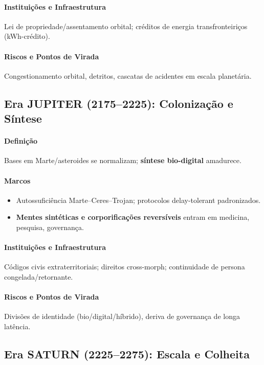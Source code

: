 \documentclass[11pt]{article}
\begin{document}
\begin{itemize}[noitemsep]
\begin{itemize}[noitemsep]
\begin{itemize}[noitemsep]
\paragraph{Instituições e Infraestrutura} Lei de propriedade/assentamento orbital; créditos de energia transfronteiriços (kWh-crédito).

\paragraph{Riscos e Pontos de Virada} Congestionamento orbital, detritos, cascatas de acidentes em escala planetária.

\subsection{Era JUPITER (2175–2225): Colonização e Síntese}
\paragraph{Definição} Bases em Marte/asteroides se normalizam; \textbf{síntese bio-digital} amadurece.

\paragraph{Marcos}
\begin{itemize}[noitemsep]
  \item Autossuficiência Marte–Ceres–Trojan; protocolos delay-tolerant padronizados.
  \item \textbf{Mentes sintéticas e corporificações reversíveis} entram em medicina, pesquisa, governança.
\end{itemize}

\paragraph{Instituições e Infraestrutura} Códigos civis extraterritoriais; direitos cross-morph; continuidade de persona congelada/retornante.

\paragraph{Riscos e Pontos de Virada} Divisões de identidade (bio/digital/híbrido), deriva de governança de longa latência.

\subsection{Era SATURN (2225–2275): Escala e Colheita}

\end{itemize}
\end{itemize}
\end{itemize}
\end{document}
